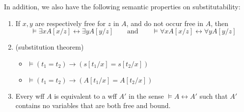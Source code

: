 \documentclass[12pt]{article}
\begin{document}
In addition, we also have the following semantic properties on substitutability:
\begin{enumerate}
\item If $x,y$ are respectively free for $z$ in $A$, and do not occur free in $A$, then
$$\models \exists x A[x/z] \leftrightarrow \exists y A[y/z] \qquad \mbox{and} \qquad \models \forall x A[x/z] \leftrightarrow \forall y A[y/z]$$
\item (substitution theorem) 
\begin{itemize}
\item $\models (t_1 = t_2) \to (s[t_1/x] =s[t_2/x])$
\item $\models (t_1 = t_2) \to (A[t_1/x] =A[t_2/x])$
\end{itemize}
\item Every wff $A$ is equivalent to a wff $A'$ in the sense $\models A\leftrightarrow A'$ such that $A'$ contains no variables that are both free and bound.
\end{enumerate}

\end{document}
